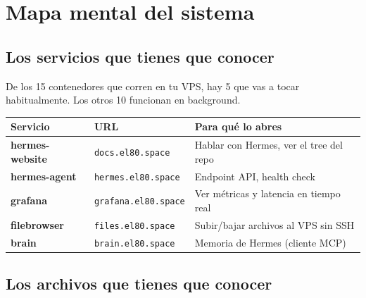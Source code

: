 \documentclass[11pt,a4paper]{article}
\begin{document}
\newpage

\section{Mapa mental del sistema}

\subsection{Los servicios que tienes que conocer}

De los 15 contenedores que corren en tu VPS, hay 5 que vas a tocar habitualmente. Los otros 10 funcionan en background.

\begin{center}
\begin{tabularx}{0.95\textwidth}{|l|l|X|}
\hline
\rowcolor{manualgreen}\color{white}\textbf{Servicio} & \color{white}\textbf{URL} & \color{white}\textbf{Para qué lo abres}\\
\hline
\textbf{hermes-website} & \texttt{docs.el80.space} & Hablar con Hermes, ver el tree del repo\\
\textbf{hermes-agent} & \texttt{hermes.el80.space} & Endpoint API, health check\\
\textbf{grafana} & \texttt{grafana.el80.space} & Ver métricas y latencia en tiempo real\\
\textbf{filebrowser} & \texttt{files.el80.space} & Subir/bajar archivos al VPS sin SSH\\
\textbf{brain} & \texttt{brain.el80.space} & Memoria de Hermes (cliente MCP)\\
\hline
\end{tabularx}
\end{center}

\subsection{Los archivos que tienes que conocer}
\end{document}
